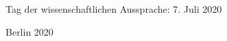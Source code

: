 \begin{titlepage}
\begin{center}
\begin{varwidth}{\textwidth}
    \vfill

      Tag der wissenschaftlichen Aussprache: 7. Juli 2020
    \end{varwidth}
  \end{center}
  \vspace{0.65cm}
  \begin{center}
    Berlin 2020

    \vfill

    {\textcolor{white}{\sffamily\docdate}}
  \end{center}
\end{titlepage}
